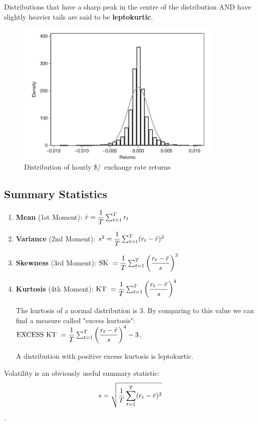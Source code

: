 \documentclass[11pt]{article}
\begin{document}
Distributions that have a sharp peak in the centre of the distribution AND have slightly heavier tails are said to be \textbf{leptokurtic}.

\begin{figure}[h]
    \centering
    \includegraphics[width = 10cm]{pics/leptokurtic.png}
    \caption{Distribution of hourly \$/\textsterling \ exchange rate returns}
    \label{fig:leptokurtic dist pound return}
\end{figure}

\subsection{Summary Statistics}

\begin{enumerate}
    \item \textbf{Mean} (1st Moment): $\Bar{r} = \dfrac{1}{T}\sum_{t=1}^T r_t$
    \item \textbf{Variance} (2nd Moment): $s^2 = \dfrac{1}{T}\sum_{t=1}^T (r_t-\Bar{r})^2$
    \item \textbf{Skewness} (3rd Moment): $\text{SK } = \dfrac{1}{T} \sum_{t=1}^T \left( \dfrac{r_t- \Bar{r}}{s} \right)^3$
    \item \textbf{Kurtosis} (4th Moment): $\text{KT } = \dfrac{1}{T}\sum_{t=1}^T \left( \dfrac{r_t- \Bar{r}}{s} \right)^4 $

    The kurtosis of a normal distribution is 3. By comparing to this value we can find a measure called "excess kurtosis": $\text{EXCESS KT } = \dfrac{1}{T}\sum_{t=1}^T \left( \dfrac{r_t- \Bar{r}}{s} \right)^4 - 3$.

    A distribution with positive excess kurtosis is leptokurtic.
\end{enumerate}

Volatility is an obviously useful summary statistic: 
\[s = \sqrt{\dfrac{1}{T}\sum_{t=1}^T (r_t - \Bar{r})^2}\].
\end{document}
